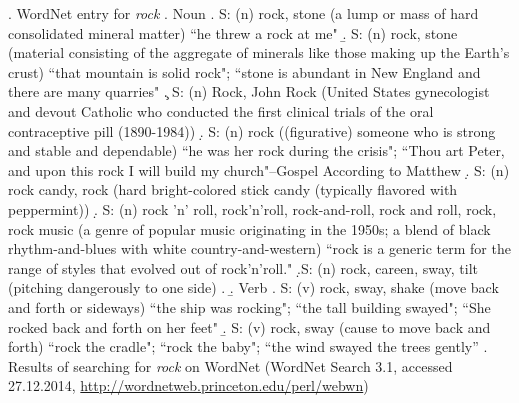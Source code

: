 \ex. WordNet entry for \emph{rock}
\a. Noun
\a. \label{ex:rock-stone}
S: (n) rock, stone (a lump or mass of hard consolidated mineral matter) ``he threw a rock at me"
\b. \label{ex:rock-material}
S: (n) rock, stone (material consisting of the aggregate of minerals like those making up the Earth's crust) ``that mountain is solid rock"; ``stone is abundant in New England and there are many quarries"   
\c. S: (n) Rock, John Rock (United States gynecologist and devout Catholic who conducted the first clinical trials of the oral contraceptive pill (1890-1984))
\d. \label{ex:rock-person}
S: (n) rock ((figurative) someone who is strong and stable and dependable) ``he was her rock during the crisis"; ``Thou art Peter, and upon this rock I will build my church"--Gospel According to Matthew
   \d. \label{ex:rock-candy}
S: (n) rock candy, rock (hard bright-colored stick candy (typically flavored with peppermint))
    \d. \label{ex:rock-music}
S: (n) rock 'n' roll, rock'n'roll, rock-and-roll, rock and roll, rock, rock music (a genre of popular music originating in the 1950s; a blend of black rhythm-and-blues with white country-and-west\-ern) ``rock is a generic term for the range of styles that evolved out of rock'n'roll."
    \d.S: (n) rock, careen, sway, tilt (pitching dangerously to one side)
\z.
\b. Verb
\a. S: (v) rock, sway, shake (move back and forth or sideways) ``the ship was rocking"; ``the tall building swayed"; ``She rocked back and forth on her feet"
\b. S: (v) rock, sway (cause to move back and forth) ``rock the cradle"; ``rock the baby"; ``the wind swayed the trees gently''
\z. Results of searching for \emph{rock} on WordNet (WordNet Search 3.1, accessed 27.12.2014, \url{http://wordnetweb.princeton.edu/perl/webwn})

